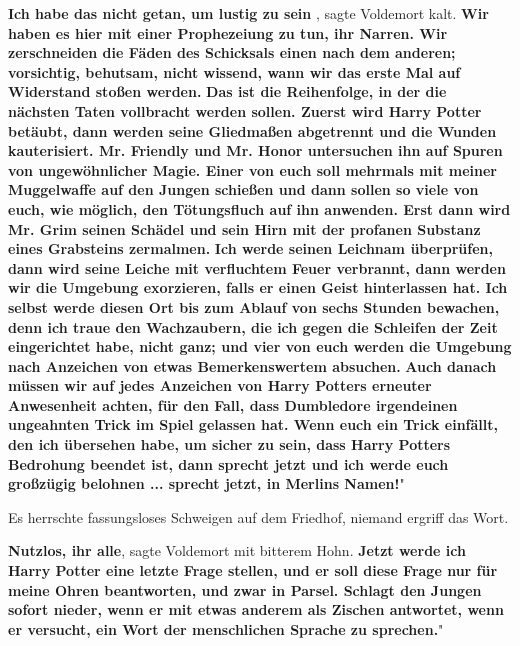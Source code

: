 \glqq \textbf{Ich habe das nicht getan, um lustig zu sein\grqq{} }, sagte
Voldemort kalt. \glqq \textbf{Wir haben es hier mit einer Prophezeiung zu tun,
ihr Narren. Wir zerschneiden die Fäden des Schicksals einen nach dem anderen;
vorsichtig, behutsam, nicht wissend, wann wir das erste Mal auf Widerstand
stoßen werden.} \textbf{ Das ist die Reihenfolge, in der die nächsten Taten
vollbracht werden sollen. Zuerst wird Harry Potter betäubt, dann werden seine
Gliedmaßen abgetrennt und die Wunden kauterisiert. Mr. Friendly und Mr. Honor
untersuchen ihn auf Spuren von ungewöhnlicher Magie. Einer von euch soll
mehrmals mit meiner Muggelwaffe auf den Jungen schießen und dann sollen so viele
von euch, wie möglich, den Tötungsfluch auf ihn anwenden. Erst dann wird Mr.
Grim seinen Schädel und sein Hirn mit der profanen Substanz eines Grabsteins
zermalmen.} \textbf{ Ich werde seinen Leichnam überprüfen, dann wird seine
Leiche mit verfluchtem Feuer verbrannt, dann werden wir die Umgebung exorzieren,
falls er einen Geist hinterlassen hat. Ich selbst werde diesen Ort bis zum
Ablauf von sechs Stunden bewachen, denn ich traue den Wachzaubern, die ich gegen
die Schleifen der Zeit eingerichtet habe, nicht ganz; und vier von euch werden
die Umgebung nach Anzeichen von etwas Bemerkenswertem absuchen.} \textbf{ Auch
danach müssen wir auf jedes Anzeichen von Harry Potters erneuter Anwesenheit
achten, für den Fall, dass Dumbledore irgendeinen ungeahnten Trick im Spiel
gelassen hat. Wenn euch ein Trick einfällt, den ich übersehen habe, um sicher zu
sein, dass Harry Potters Bedrohung beendet ist, dann sprecht jetzt und ich werde
euch großzügig belohnen ... sprecht jetzt, in Merlins Namen!}"

Es herrschte fassungsloses Schweigen auf dem Friedhof, niemand ergriff das Wort.

\glqq \textbf{Nutzlos, ihr alle}\grqq{}, sagte Voldemort mit bitterem Hohn.
\glqq \textbf{Jetzt werde ich Harry Potter eine letzte Frage stellen, und er
soll diese Frage nur für meine Ohren beantworten, und zwar in Parsel. Schlagt
den Jungen sofort nieder, wenn er mit etwas anderem als Zischen antwortet, wenn
er versucht, ein Wort der menschlichen Sprache zu sprechen.}"

